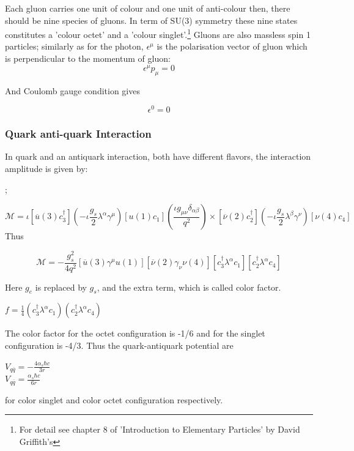Each gluon carries one unit of colour and one unit of anti-colour then, there should be nine species of gluons. In term of SU(3) symmetry these nine states constitutes a 'colour octet' and a 'colour singlet'.\footnote{For detail see chapter 8 of 'Introduction to Elementary Particles' by David Griffith's}
Gluons are also massless spin 1 particles; similarly as for the photon, $\epsilon^{\mu}$ is the polarisation vector of gluon which is perpendicular to the momentum of gluon:
\begin{equation}
\epsilon^{\mu}p_{\mu}=0
\end{equation}

And Coulomb gauge condition gives

\begin{equation}
\epsilon^{0}=0
\end{equation}

\subsubsection{Quark anti-quark Interaction}
In quark and an antiquark interaction, both have different flavors, the interaction amplitude is given by:
\begin{center}
;
\end{center}

\begin{equation}
\mathcal{M}=\iota[\overline{u}(3)c_{3}^{\dagger}](-\iota\frac{g_{s}}{2} \lambda^{\alpha}\gamma^{\mu})[u(1)c_{1}](\frac{\iota g_{\mu\nu}\delta_{\alpha\beta}}{q^{2}})\times[\overline{\nu}(2)c_{2}^{\dagger}](-\iota\frac{g_{s}}{2} \lambda^{\beta}\gamma^{\nu})[\nu(4)c_{4}]
\end{equation}
Thus

\begin{equation}
\mathcal{M}=-\frac{g_{s}^{2}}{4q^{2}}[\overline{u}(3)\gamma^{\mu}u(1)][\overline{\nu}(2)\gamma_{\nu}\nu(4)][c_{3}^{\dagger}\lambda^{\alpha}c_{1}][c_{2}^{\dagger}\lambda^{\alpha}c_{4}]
\end{equation}


Here $g_{e}$ is replaced by $g_{s}$, and the extra term, which is called color factor.\\
\begin{center}
$f=\frac{1}{4}(c_{3}^{\dagger}\lambda^{\alpha}c_{1})(c_{2}^{\dagger}\lambda^{\alpha}c_{4})$
\end{center}
The color factor for the octet configuration is -1/6 and for the singlet configuration is -4/3. Thus the quark-antiquark potential are
\begin{center}
$V_{q\overline{q}}=-\frac{4\alpha_{s}\hbar c}{3r}$\\
$V_{q\overline{q}}=\frac{\alpha_{s}\hbar c}{6r}$
\end{center}
for color singlet and color octet configuration respectively. 

